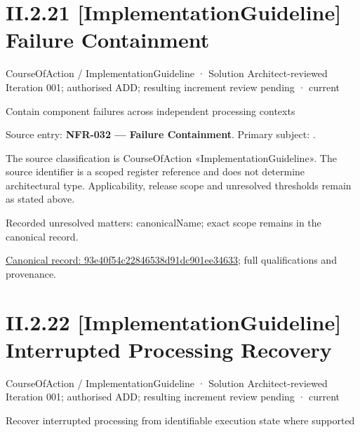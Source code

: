 \section*{II.2.21 [ImplementationGuideline] Failure Containment}
\label{navigation:II.2.21}

\label{element:93e40f54c22846538d91dc901ee34633}
{\small CourseOfAction / ImplementationGuideline · Solution Architect-reviewed Iteration 001; authorised ADD; resulting increment review pending · current}\par

Contain component failures across independent processing contexts



Source entry: \textbf{NFR-032 — Failure Containment}. Primary subject: \texttt{}.



The source classification is CourseOfAction «ImplementationGuideline». The source identifier is a scoped register reference and does not determine architectural type. Applicability, release scope and unresolved thresholds remain as stated above.


{\small Recorded unresolved matters: canonicalName; exact scope remains in the canonical record.}\par
{\footnotesize \href{../../../../continuum/strategy/course-of-action/implementation-guideline/93e40f54c22846538d91dc901ee34633.md}{Canonical record: 93e40f54c22846538d91dc901ee34633}; full qualifications and provenance.}\par
\section*{II.2.22 [ImplementationGuideline] Interrupted Processing Recovery}
\label{navigation:II.2.22}

\label{element:6ca05ae8b3b34c1493ecdb48cfda1979}
{\small CourseOfAction / ImplementationGuideline · Solution Architect-reviewed Iteration 001; authorised ADD; resulting increment review pending · current}\par

Recover interrupted processing from identifiable execution state where supported



